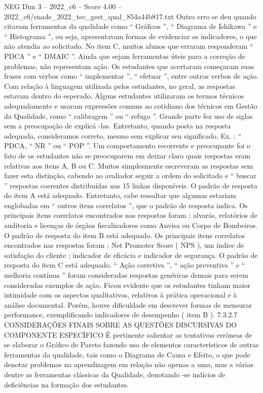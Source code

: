 \begin{textsample}{NEG Dim 3 – 2022\_c6 – Score 4.00 – 2022\_c6/enade\_2022\_tec\_gest\_qual\_854a44b817.txt}
Outro erro se deu quando citavam ferramentas da qualidade como “ Gráficos ”, “ Diagrama de Ishikawa ” e “ Histograma ”, ou seja, apresentavam formas de evidenciar os indicadores, o que não atendia ao solicitado.
No item C, muitos alunos que erraram responderam “ PDCA ” e “ DMAIC ”.
Ainda que sejam ferramentas úteis para a correção de problemas, não representam ação.
Os estudantes que acertaram começaram suas frases com verbos como “ implementar ”, “ efetuar ”, entre outros verbos de ação.
Com relação à linguagem utilizada pelos estudantes, no geral, as respostas estavam dentro do esperado.
Alguns estudantes utilizaram os termos técnicos adequadamente e usaram expressões comuns ao cotidiano dos técnicos em Gestão da Qualidade, como “ calibragem ” ou “ refugo ”.
Grande parte fez uso de siglas sem a preocupação de explicá -las.
Entretanto, quando posta na resposta adequada, consideramos correto, mesmo sem explicar seu significado.
Ex. : “ PDCA, “ NR ” ou “ POP ”.
Um comportamento recorrente e preocupante foi o fato de os estudantes não se preocuparem em deixar claro quais respostas eram relativas aos itens A, B ou C.
Muitos simplesmente escreveram as respostas sem fazer esta distinção, cabendo ao avaliador seguir a ordem do solicitado e “ buscar ” respostas coerentes distribuídas nas 15 linhas disponíveis.
O padrão de resposta do item A está adequado.
Entretanto, cabe ressaltar que algumas estariam englobadas em “ outros itens correlatos ”, que o padrão de resposta indica.
Os principais itens correlatos encontrados nas respostas foram : alvarás, relatórios de auditoria e licenças de órgãos fiscalizadores como Anvisa ou Corpo de Bombeiros.
O padrão de resposta do item B está adequado.
Os principais itens correlatos encontrados nas respostas foram : Net Promoter Score ( NPS ), um índice de satisfação do cliente ; indicador de eficácia e indicador de segurança.
O padrão de resposta do item C está adequado. “ Ação corretiva ”, “ ação preventiva ” e “ melhoria contínua ” foram consideradas respostas genéricas demais para serem consideradas exemplos de ação.
Ficou evidente que os estudantes tinham maior intimidade com os aspectos qualitativos, relativos à prática operacional e à análise documental.
Porém, houve dificuldade em descrever formas de mensurar performance, exemplificando indicadores de desempenho ( item B ). 7.3.2.7 CONSIDERAÇÕES FINAIS SOBRE AS QUESTÕES DISCURSIVAS DO COMPONENTE ESPECÍFICO É pertinente salientar as tentativas errôneas de se elaborar o Gráfico de Pareto fazendo uso de elementos característicos de outras ferramentas da qualidade, tais como o Diagrama de Causa e Efeito, o que pode denotar problemas na aprendizagem em relação não apenas a uma, mas a várias dentre as ferramentas clássicas da Qualidade, denotando -se indícios de deficiências na formação dos estudantes.

\end{textsample}
